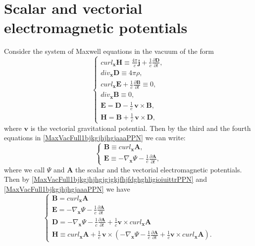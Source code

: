 \documentclass{article}
\theoremstyle{definition}
\theoremstyle{remark}
\renewcommand{\vec}[1]{\mathbf{#1}}
\newcommand{\R}{\mathbb{R}}
\newcommand{\er}{\eqref}
\newcommand{\R}{{\mathbb{R}}}
\newcommand{\er}{\eqref}
\begin{document}
\section{Scalar and vectorial electromagnetic potentials}\label{ghfvdgfdjfg}
Consider
the system of Maxwell equations in the vacuum of the form
\begin{equation}\label{MaxVacFull1bjkgjhjhgjaaaPPN}
\begin{cases}
curl_{\vec x} \vec H\equiv \frac{4\pi}{c}\vec
j+\frac{1}{c}\frac{\partial
\vec D}{\partial t},\\
div_{\vec x} \vec D\equiv 4\pi\rho,\\
curl_{\vec x} \vec E+\frac{1}{c}\frac{\partial \vec B}{\partial t}\equiv 0,\\
div_{\vec x} \vec B\equiv 0,\\
\vec E=\vec D-\frac{1}{c}\,\vec v\times \vec B,\\
\vec H=\vec B+\frac{1}{c}\,\vec v\times \vec D,
\end{cases}
\end{equation}
where $\vec v$ is the vectorial gravitational potential. Then by the
third and the fourth equations in \er{MaxVacFull1bjkgjhjhgjaaaPPN}
we can write:
\begin{equation}\label{MaxVacFull1bjkgjhjhgjgjgkjfhjfdghghligioiuittrPPN}
\begin{cases}
\vec B\equiv curl_{\vec x} \vec A,\\
\vec E\equiv-\nabla_{\vec x}\Psi-\frac{1}{c}\frac{\partial\vec
A}{\partial t},
\end{cases}
\end{equation}
where we call $\Psi$ and $\vec A$ the scalar and the vectorial
electromagnetic potentials. Then by
\er{MaxVacFull1bjkgjhjhgjgjgkjfhjfdghghligioiuittrPPN} and
\er{MaxVacFull1bjkgjhjhgjaaaPPN} we have
\begin{equation}\label{vhfffngghPPN333yuyu}
\begin{cases}
\vec B= curl_{\vec x} \vec A\\
\vec E=-\nabla_{\vec x}\Psi-\frac{1}{c}\frac{\partial\vec
A}{\partial t}\\
 \vec D=-\nabla_{\vec
x}\Psi-\frac{1}{c}\frac{\partial\vec A}{\partial t}+\frac{1}{c}\vec
v\times curl_{\vec x}\vec A\\
\vec H\equiv curl_{\vec x} \vec A+\frac{1}{c}\,\vec
v\times\left(-\nabla_{\vec x}\Psi-\frac{1}{c}\frac{\partial\vec
A}{\partial t}+\frac{1}{c}\vec v\times curl_{\vec x}\vec A\right).
\end{cases}
\end{equation}
\end{document}
